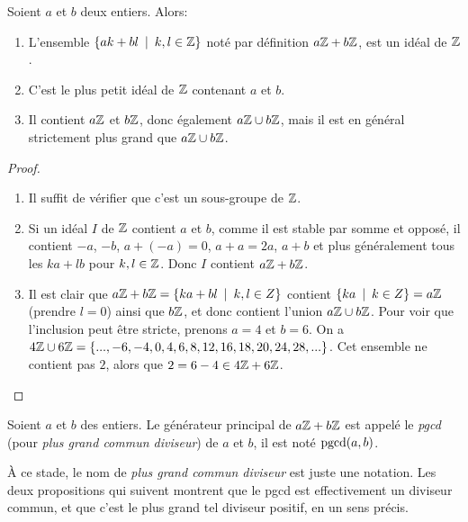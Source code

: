 \begin{proposition}
Soient $a$ et $b$ deux entiers. Alors:
\begin{enumerate}
\item L'ensemble $\{ak+bl\:\mid\: k, l\in \Z\}$ noté par définition $a\mathbb{Z}+b\mathbb{Z}$, est un idéal de $\mathbb{Z}$.
\item C'est le plus petit idéal de $\mathbb{Z}$ contenant $a$ et $b$. %
\item Il contient $a\mathbb{Z}$ et $b\mathbb{Z}$, donc également $a\mathbb{Z}\cup b\mathbb{Z}$, mais il est en général strictement plus grand que $a\mathbb{Z}\cup b\mathbb{Z}$.
\end{enumerate}
\end{proposition}
\begin{proof}
\begin{enumerate}
\item Il suffit de vérifier que c'est un sous-groupe de $\mathbb{Z}$.
\item Si un idéal $I$ de $\mathbb{Z}$ contient $a$ et $b$, comme il est stable par somme et opposé, il contient $-a$, $-b$, $a+(-a)=0$, $a+a=2a$, $a+b$ et plus généralement tous les $ka+lb$ pour $k,l\in\mathbb{Z}$. Donc $I$ contient $a\mathbb{Z}+b\mathbb{Z}$.
\item Il est clair que $a\Z+b\Z=\{ka+bl\:\mid\: k,l\in Z\}$ contient $\{ka\:\mid\: k\in Z\} = a\Z$ (prendre $l=0$) ainsi que $b\mathbb{Z}$, et donc contient l'union $a\mathbb{Z}\cup b\mathbb{Z}$. Pour voir que l'inclusion peut être stricte, prenons $a=4$ et $b=6$. On a $4\mathbb{Z}\cup 6\mathbb{Z} = \{ ..., -6,-4,0,4,6,8,12,16,18,20,24,28, ...\}$. Cet ensemble ne contient pas $2$, alors que $2=6-4\in 4\mathbb{Z}+6\mathbb{Z}$.
\end{enumerate}
\end{proof}


\begin{definition}
Soient $a$ et $b$ des entiers. Le générateur principal de $a\mathbb{Z}+b\mathbb{Z}$ est appelé le \emph{pgcd} (pour \emph{plus grand commun diviseur}) de $a$ et $b$, il est noté $\operatorname{pgcd}(a,b)$.
\end{definition}

\begin{remarque}
À ce stade, le nom de \emph{plus grand commun diviseur} est juste une notation. Les deux propositions qui suivent montrent que le pgcd est effectivement un diviseur commun, et que c'est le plus grand tel diviseur positif, en un sens précis.
\end{remarque}

